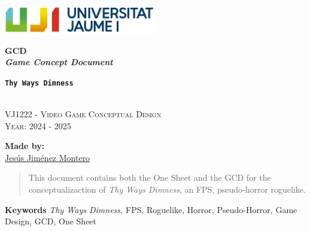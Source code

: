 \documentclass[12pt]{article}
\newcommand{\gameTitle}{\texttt{\textbf{Thy Ways Dimness}}\xspace}
\begin{document}
\begin{titlepage}
    \centering
    \vspace*{5cm}

    \includegraphics[width=0.5\textwidth]{Imagenes/marca-uji-color.jpg}\par\vspace{1cm}

    {\Huge \bfseries GCD \\ \textit{Game Concept Document} \par}
    {\large \bfseries \gameTitle \par}

    \textsc{\large }
    \vspace{0.5cm} \\
    \textsc{\Large VJ1222 - Video Game Conceptual Design}
    \vspace{0.5cm} \\
    \textsc{\large Year: 2024 - 2025}
    \vfill

    \textbf{Made by:}         \\
    \href{https://www.richardotomislav.com/}{Jesús Jiménez Montero }      \\

    \vspace{1cm}

    \vfill
\end{titlepage}

\begin{abstract}
    This document contains both the One Sheet and the GCD for the conceptualizaction of \textit{Thy Ways Dimness}, an FPS, pseudo-horror roguelike.
\end{abstract}
{\small \textbf{Keywords} \textit{Thy Ways Dimness,} FPS, Roguelike, Horror, Pseudo-Horror, Game Design, GCD, One Sheet}
\newpage

\hypertarget{toc}{}
\begin{multicols}{2}
    \tableofcontents
\end{multicols}
\newpage

\begin{multicols}{2}
    \listoftables
\end{multicols}
\newpage
\end{document}
